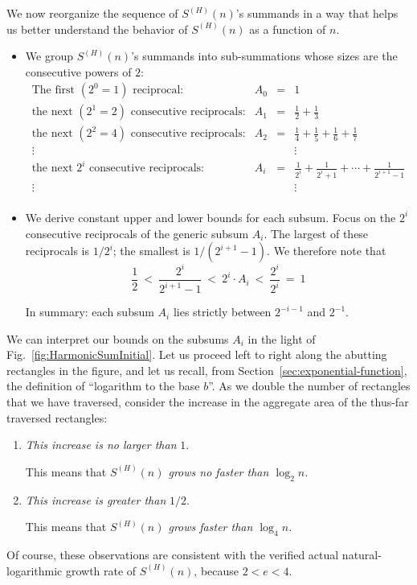 \medskip

We now reorganize the sequence of $S^{(H)}(n)$'s summands in a way that helps us better understand the behavior of $S^{(H)}(n)$ as a function of $n$.
\begin{itemize}
\item
We group $S^{(H)}(n)$'s summands into sub-summations whose sizes are the consecutive powers of $2$:
\[ \begin{array}{llcl}
\mbox{The first $(2^0 =1)$ reciprocal:} &
A_0 & = &  {\displaystyle 1 } \\[1.01em]
\mbox{the next $(2^1 =2)$ consecutive reciprocals:} &
A_1 & = &  {\displaystyle \frac{1}{2} + \frac{1}{3} }  \\[1.01em]
\mbox{the next $(2^2 =4)$ consecutive reciprocals:} &
A_2 & = &  {\displaystyle \frac{1}{4} + \frac{1}{5} + \frac{1}{6} + \frac{1}{7} } \\
\vdots &  & & \vdots \\
\mbox{the next $2^i$ consecutive reciprocals:} &
A_i & = &  {\displaystyle \frac{1}{2^i} + \frac{1}{2^i+1} + \cdots +
     \frac{1}{2^{i+1}-1}  } \\
\vdots &  & & \vdots \\
\end{array}
\]
\medskip\item
We derive constant upper and lower bounds for each subsum.  Focus on the $2^i$ consecutive reciprocals of the generic subsum $A_i$.  The largest of these reciprocals is $1/2^i$; the smallest is $1/(2^{i+1}-1)$.  We therefore note that
\[
\frac{1}{2}
 \ < \
\frac{2^i}{2^{i+1}-1}
 \ < \
2^i \cdot A_i
  \ < \
\frac{2^i}{2^i}
  \ = \ 1
\]

In summary: each subsum $A_i$ lies strictly between $2^{-i-1}$ and $2^{-1}$.
\end{itemize}

We can interpret our bounds on the subsums $A_i$ in the light of Fig.~\ref{fig:HarmonicSumInitial}.   Let us proceed left to right along the abutting rectangles in the figure, and let us recall, from Section~\ref{sec:exponential-function}, the definition of
``logarithm to the base $b$''.  As we double the number of rectangles that we have traversed, consider the increase in the aggregate area of the thus-far traversed rectangles:
\begin{enumerate}
\item
{\em This increase is no larger than} $1$.

\smallskip

This means that {\em $S^{(H)}(n)$ grows no faster than $\log_2 n$.}

\medskip\item
{\em This increase is greater than} $1/2$.

\smallskip

This means that {\em $S^{(H)}(n)$ grows faster than $\log_4 n$.}
\end{enumerate}
Of course, these observations are consistent with the verified actual natural-logarithmic growth rate of $S^{(H)}(n)$, because $2 < e < 4$.


